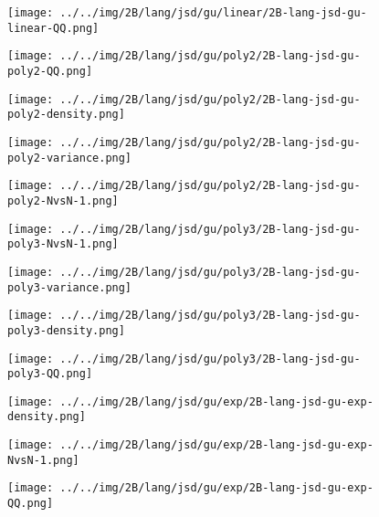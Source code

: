 \begin{figure}[H]
\centering	\texttt{[image: ../../img/2B/lang/jsd/gu/linear/2B-lang-jsd-gu-linear-QQ.png]}
\end{figure}
\begin{figure}[H]
\centering	\texttt{[image: ../../img/2B/lang/jsd/gu/poly2/2B-lang-jsd-gu-poly2-QQ.png]}
\end{figure}
\begin{figure}[H]
\centering	\texttt{[image: ../../img/2B/lang/jsd/gu/poly2/2B-lang-jsd-gu-poly2-density.png]}
\end{figure}
\begin{figure}[H]
\centering	\texttt{[image: ../../img/2B/lang/jsd/gu/poly2/2B-lang-jsd-gu-poly2-variance.png]}
\end{figure}
\begin{figure}[H]
\centering	\texttt{[image: ../../img/2B/lang/jsd/gu/poly2/2B-lang-jsd-gu-poly2-NvsN-1.png]}
\end{figure}
\begin{figure}[H]
\centering	\texttt{[image: ../../img/2B/lang/jsd/gu/poly3/2B-lang-jsd-gu-poly3-NvsN-1.png]}
\end{figure}
\begin{figure}[H]
\centering	\texttt{[image: ../../img/2B/lang/jsd/gu/poly3/2B-lang-jsd-gu-poly3-variance.png]}
\end{figure}
\begin{figure}[H]
\centering	\texttt{[image: ../../img/2B/lang/jsd/gu/poly3/2B-lang-jsd-gu-poly3-density.png]}
\end{figure}
\begin{figure}[H]
\centering	\texttt{[image: ../../img/2B/lang/jsd/gu/poly3/2B-lang-jsd-gu-poly3-QQ.png]}
\end{figure}
\begin{figure}[H]
\centering	\texttt{[image: ../../img/2B/lang/jsd/gu/exp/2B-lang-jsd-gu-exp-density.png]}
\end{figure}
\begin{figure}[H]
\centering	\texttt{[image: ../../img/2B/lang/jsd/gu/exp/2B-lang-jsd-gu-exp-NvsN-1.png]}
\end{figure}
\begin{figure}[H]
\centering	\texttt{[image: ../../img/2B/lang/jsd/gu/exp/2B-lang-jsd-gu-exp-QQ.png]}
\end{figure}
